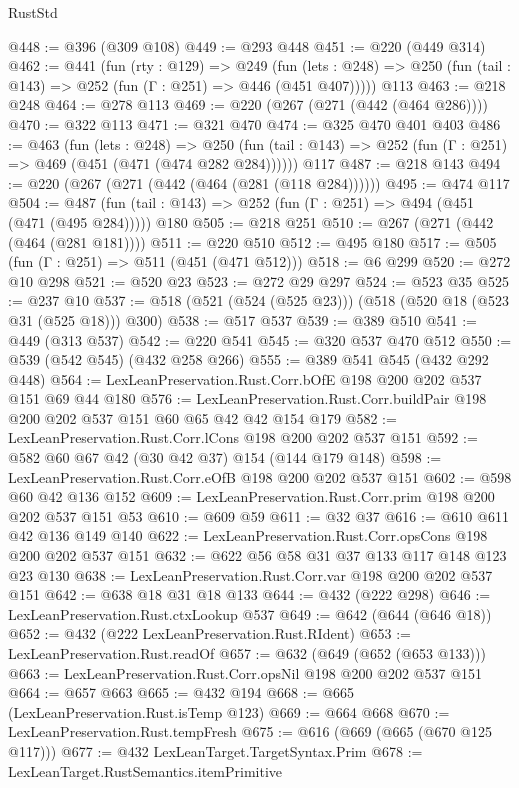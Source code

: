 \begin{lexlean}{RustStd}
\begin{coremodule}
@448 := @396 (@309 @108)
@449 := @293 @448
@451 := @220 (@449 @314)
@462 := @441
    (fun (rty : @129) =>
    @249
      (fun (lets : @248) => @250 (fun (tail : @143) => @252 (fun (Γ : @251) => @446 (@451 @407)))))
    @113
@463 := @218 @248
@464 := @278 @113
@469 := @220 (@267 (@271 (@442 (@464 @286))))
@470 := @322 @113
@471 := @321 @470
@474 := @325 @470 @401 @403
@486 := @463
    (fun (lets : @248) =>
    @250 (fun (tail : @143) => @252 (fun (Γ : @251) => @469 (@451 (@471 (@474 @282 @284))))))
    @117
@487 := @218 @143
@494 := @220 (@267 (@271 (@442 (@464 (@281 (@118 @284))))))
@495 := @474 @117
@504 := @487 (fun (tail : @143) => @252 (fun (Γ : @251) => @494 (@451 (@471 (@495 @284))))) @180
@505 := @218 @251
@510 := @267 (@271 (@442 (@464 (@281 @181))))
@511 := @220 @510
@512 := @495 @180
@517 := @505 (fun (Γ : @251) => @511 (@451 (@471 @512)))
@518 := @6 @299
@520 := @272 @10 @298
@521 := @520 @23
@523 := @272 @29 @297
@524 := @523 @35
@525 := @237 @10
@537 := @518 (@521 (@524 (@525 @23))) (@518 (@520 @18 (@523 @31 (@525 @18))) @300)
@538 := @517 @537
@539 := @389 @510
@541 := @449 (@313 @537)
@542 := @220 @541
@545 := @320 @537 @470 @512
@550 := @539 (@542 @545) (@432 @258 @266)
@555 := @389 @541 @545 (@432 @292 @448)
@564 := LexLeanPreservation.Rust.Corr.bOfE @198 @200 @202 @537 @151 @69 @44 @180
@576 := LexLeanPreservation.Rust.Corr.buildPair @198 @200 @202 @537 @151 @60 @65 @42 @42 @154 @179
@582 := LexLeanPreservation.Rust.Corr.lCons @198 @200 @202 @537 @151
@592 := @582 @60 @67 @42 (@30 @42 @37) @154 (@144 @179 @148)
@598 := LexLeanPreservation.Rust.Corr.eOfB @198 @200 @202 @537 @151
@602 := @598 @60 @42 @136 @152
@609 := LexLeanPreservation.Rust.Corr.prim @198 @200 @202 @537 @151 @53
@610 := @609 @59
@611 := @32 @37
@616 := @610 @611 @42 @136 @149 @140
@622 := LexLeanPreservation.Rust.Corr.opsCons @198 @200 @202 @537 @151
@632 := @622 @56 @58 @31 @37 @133 @117 @148 @123 @23 @130
@638 := LexLeanPreservation.Rust.Corr.var @198 @200 @202 @537 @151
@642 := @638 @18 @31 @18 @133
@644 := @432 (@222 @298)
@646 := LexLeanPreservation.Rust.ctxLookup @537
@649 := @642 (@644 (@646 @18))
@652 := @432 (@222 LexLeanPreservation.Rust.RIdent)
@653 := LexLeanPreservation.Rust.readOf
@657 := @632 (@649 (@652 (@653 @133)))
@663 := LexLeanPreservation.Rust.Corr.opsNil @198 @200 @202 @537 @151
@664 := @657 @663
@665 := @432 @194
@668 := @665 (LexLeanPreservation.Rust.isTemp @123)
@669 := @664 @668
@670 := LexLeanPreservation.Rust.tempFresh
@675 := @616 (@669 (@665 (@670 @125 @117)))
@677 := @432 LexLeanTarget.TargetSyntax.Prim
@678 := LexLeanTarget.RustSemantics.itemPrimitive

\end{coremodule}
\end{lexlean}
